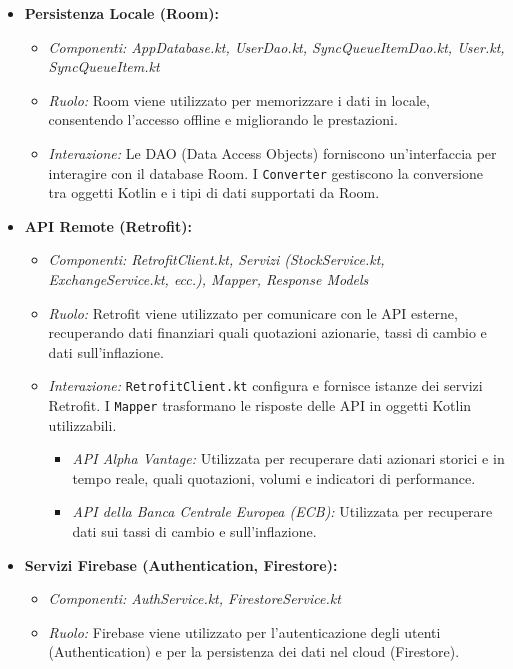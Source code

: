 \documentclass{article}
\begin{document}
\begin{itemize}
    \item \textbf{Persistenza Locale (Room):}
    \begin{itemize}
        \item \textit{Componenti: AppDatabase.kt, UserDao.kt, SyncQueueItemDao.kt, User.kt, SyncQueueItem.kt}
        \item \textit{Ruolo:} Room viene utilizzato per memorizzare i dati in locale, consentendo l'accesso offline e migliorando le prestazioni.
        \item \textit{Interazione:} Le DAO (Data Access Objects) forniscono un'interfaccia per interagire con il database Room. I \texttt{Converter} gestiscono la conversione tra oggetti Kotlin e i tipi di dati supportati da Room.
    \end{itemize}
    \item \textbf{API Remote (Retrofit):}
    \begin{itemize}
        \item \textit{Componenti: RetrofitClient.kt, Servizi (StockService.kt, ExchangeService.kt, ecc.), Mapper, Response Models}
        \item \textit{Ruolo:} Retrofit viene utilizzato per comunicare con le API esterne, recuperando dati finanziari quali quotazioni azionarie, tassi di cambio e dati sull'inflazione.
        \item \textit{Interazione:} \texttt{RetrofitClient.kt} configura e fornisce istanze dei servizi Retrofit. I \texttt{Mapper} trasformano le risposte delle API in oggetti Kotlin utilizzabili.
        \begin{itemize}
            \item \textit{API Alpha Vantage:} Utilizzata per recuperare dati azionari storici e in tempo reale, quali quotazioni, volumi e indicatori di performance.
            \item \textit{API della Banca Centrale Europea (ECB):} Utilizzata per recuperare dati sui tassi di cambio e sull'inflazione.
        \end{itemize}
    \end{itemize}
    \item \textbf{Servizi Firebase (Authentication, Firestore):}
    \begin{itemize}
        \item \textit{Componenti: AuthService.kt, FirestoreService.kt}
        \item \textit{Ruolo:} Firebase viene utilizzato per l'autenticazione degli utenti (Authentication) e per la persistenza dei dati nel cloud (Firestore).

\end{itemize}
\end{itemize}
\end{document}
